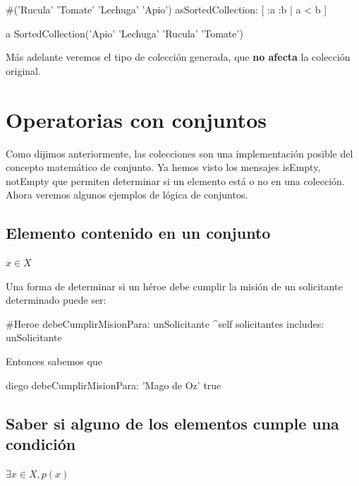 \documentclass[a4paper,12pt]{book}
\begin{document}
\begin{code}
#('Rucula' 'Tomate' 'Lechuga' 'Apio') 
    asSortedCollection: [ :a :b | a < b ]
    
    a SortedCollection('Apio' 'Lechuga' 'Rucula' 'Tomate')
\end{code}

\vspace{\baselineskip}
Más adelante veremos el tipo de colección generada, que \textbf{no afecta} la colección original.

\section{Operatorias con conjuntos}

Como dijimos anteriormente, las colecciones son una implementación posible del concepto matemático de conjunto.
Ya hemos visto los mensajes isEmpty, notEmpty que permiten determinar si un elemento está o no en una colección.
Ahora veremos algunos ejemplos de lógica de conjuntos.

\subsection{Elemento contenido en un conjunto}

\begin{mdframed}[style=BoxFrame]
\( x \in X \)
\end{mdframed}
 
Una forma de determinar si un héroe debe cumplir la misión de un solicitante determinado puede ser:

\begin{code}
#Heroe
debeCumplirMisionPara: unSolicitante
    ^self solicitantes includes: unSolicitante
\end{code}

Entonces sabemos que

\begin{code}
diego debeCumplirMisionPara: 'Mago de Oz'
    true
\end{code}

\subsection{Saber si alguno de los elementos cumple una condición}

\begin{mdframed}[style=BoxFrame]
\( \exists x \in X, p(x) \)
\end{mdframed}
\end{document}
